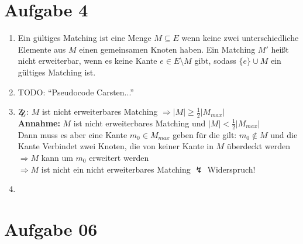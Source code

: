 \documentclass[10pt,a4paper]{article}
\newcommand{\zz}{\mathrm{Z\kern-.3em\raise-0.5ex\hbox{Z}}}
\begin{document}
\section*{Aufgabe 4}

    \begin{enumerate}[label={\alph*)}]
        \item Ein gültiges Matching ist eine Menge $M \subseteq E$ wenn keine
            zwei unterschiedliche Elemente aus $M$ einen gemeinsamen Knoten
            haben.
            Ein Matching $M'$ heißt nicht erweiterbar, wenn es keine Kante
            $ e \in E \setminus M$ gibt, sodass $\{e\} \cup M$ ein gültiges
            Matching ist.
        \item
            TODO: ``Pseudocode Carsten...''
        \item
            $\zz$: $M$ ist nicht erweiterbares Matching $\Rightarrow
            |M| \geq \frac{1}{2}|M_{max}|$
            \\
            \textbf{Annahme:} $M$ ist nicht erweiterbares Matching und 
            $|M| < \frac{1}{2}|M_{max}|$
            \\
            Dann muss es aber eine Kante $m_0 \in M_{max}$ geben für
            die gilt: $m_0 \notin M$ und die Kante Verbindet zwei Knoten,
            die von keiner Kante in $M$ überdeckt werden
            \\
            $\Rightarrow M$ kann um $m_0$ erweitert werden
            \\
            $\Rightarrow M$ ist nicht ein nicht erweiterbares Matching
            $\lightning$ Widerspruch!
        \item
            
    \end{enumerate}

\section*{Aufgabe 06}
\end{document}
